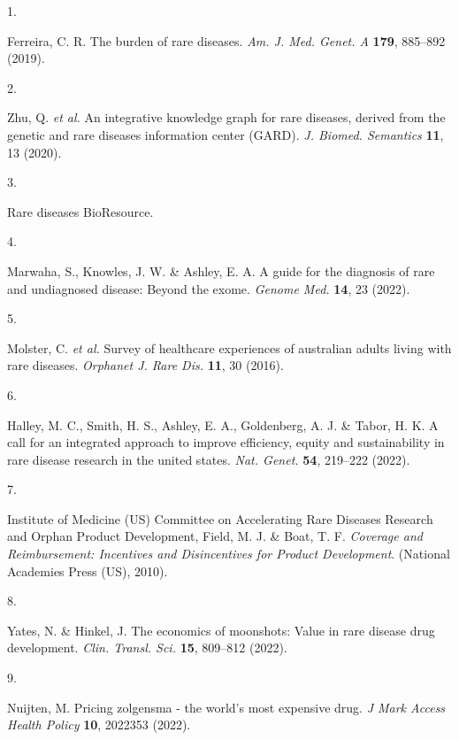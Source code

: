 \documentclass[
]{article}
\newlength{\cslhangindent}
\newlength{\csllabelwidth}
\newenvironment{CSLReferences}[2] %
 {\begin{list}{}{%
  \setlength{\itemindent}{0pt}
  \setlength{\leftmargin}{0pt}
  \setlength{\parsep}{0pt}
  \ifodd #1
   \setlength{\leftmargin}{\cslhangindent}
   \setlength{\itemindent}{-1\cslhangindent}
  \fi
  \setlength{\itemsep}{#2\baselineskip}}}
 {\end{list}}
\newcommand{\CSLLeftMargin}[1]{\parbox[t]{\csllabelwidth}{\strut#1\strut}}
\newcommand{\CSLRightInline}[1]{\parbox[t]{\linewidth - \csllabelwidth}{\strut#1\strut}}
\begin{document}
\label{refs}
\begin{CSLReferences}{0}{0}
\CSLLeftMargin{1. }%
\CSLRightInline{Ferreira, C. R. The burden of rare diseases. \emph{Am.
J. Med. Genet. A} \textbf{179}, 885--892 (2019).}

\CSLLeftMargin{2. }%
\CSLRightInline{Zhu, Q. \emph{et al.} An integrative knowledge graph for
rare diseases, derived from the genetic and rare diseases information
center ({GARD}). \emph{J. Biomed. Semantics} \textbf{11}, 13 (2020).}

\CSLLeftMargin{3. }%
\CSLRightInline{Rare diseases {BioResource}.}

\CSLLeftMargin{4. }%
\CSLRightInline{Marwaha, S., Knowles, J. W. \& Ashley, E. A. A guide for
the diagnosis of rare and undiagnosed disease: Beyond the exome.
\emph{Genome Med.} \textbf{14}, 23 (2022).}

\CSLLeftMargin{5. }%
\CSLRightInline{Molster, C. \emph{et al.} Survey of healthcare
experiences of australian adults living with rare diseases.
\emph{Orphanet J. Rare Dis.} \textbf{11}, 30 (2016).}

\CSLLeftMargin{6. }%
\CSLRightInline{Halley, M. C., Smith, H. S., Ashley, E. A., Goldenberg,
A. J. \& Tabor, H. K. A call for an integrated approach to improve
efficiency, equity and sustainability in rare disease research in the
united states. \emph{Nat. Genet.} \textbf{54}, 219--222 (2022).}

\CSLLeftMargin{7. }%
\CSLRightInline{Institute of Medicine (US) Committee on Accelerating
Rare Diseases Research and Orphan Product Development, Field, M. J. \&
Boat, T. F. \emph{Coverage and Reimbursement: Incentives and
Disincentives for Product Development}. (National Academies Press (US),
2010).}

\CSLLeftMargin{8. }%
\CSLRightInline{Yates, N. \& Hinkel, J. The economics of moonshots:
Value in rare disease drug development. \emph{Clin. Transl. Sci.}
\textbf{15}, 809--812 (2022).}

\CSLLeftMargin{9. }%
\CSLRightInline{Nuijten, M. Pricing zolgensma - the world's most
expensive drug. \emph{J Mark Access Health Policy} \textbf{10}, 2022353
(2022).}


\end{CSLReferences}
\end{document}
